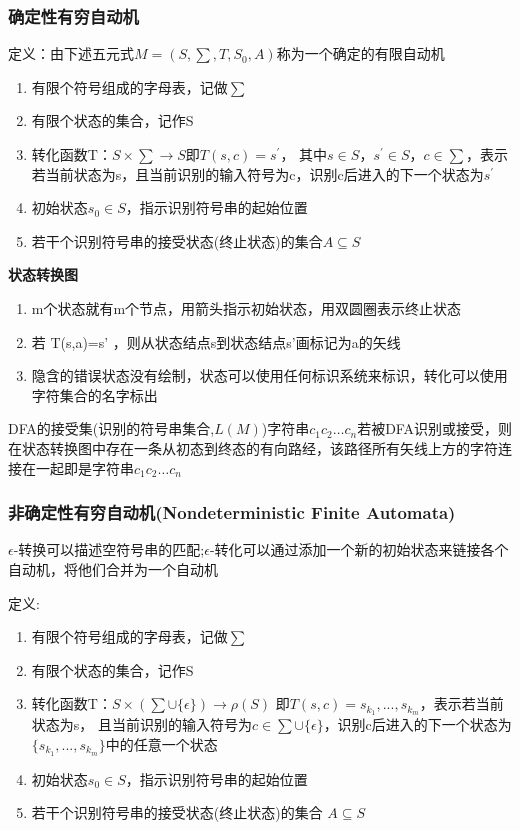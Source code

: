 \documentclass[utf8]{ctexart}
\begin{document}
\subsubsection{确定性有穷自动机}
定义：由下述五元式$M=(S,\sum ,T,S_0,A)$称为一个确定的有限自动机
\begin{enumerate}
    \item 有限个符号组成的字母表，记做$\sum$
    \item 有限个状态的集合，记作S
    \item 转化函数T：$S \times \sum  \rightarrow S$即$T(s,c)=s^{'}$，
    其中$s\in S， s^{'} \in S，c \in \sum$，表示若当前状态为s，且当前识别的输入符号为c，识别c后进入的下一个状态为$s^{'}$
    \item 初始状态$s_0 \in S$，指示识别符号串的起始位置
    \item 若干个识别符号串的接受状态(终止状态)的集合$A\subseteq S$
\end{enumerate}

\noindent \textbf{状态转换图}
\begin{enumerate}
    \item m个状态就有m个节点，用箭头指示初始状态，用双圆圈表示终止状态
    \item 若 T(s,a)=s’ ，则从状态结点s到状态结点s’画标记为a的矢线
    \item 隐含的错误状态没有绘制，状态可以使用任何标识系统来标识，转化可以使用字符集合的名字标出
\end{enumerate}
DFA的接受集(识别的符号串集合,$L(M)$)字符串$c_{1} c_{2} \dots c_{n}$若被DFA识别或接受，则在状态转换图中存在一条从初态到终态的有向路经，该路径所有矢线上方的字符连接在一起即是字符串$c_{1} c_{2} \dots c_{n}$

\subsubsection{非确定性有穷自动机(Nondeterministic Finite Automata)}
$\epsilon$-转换可以描述空符号串的匹配;$\epsilon$-转化可以通过添加一个新的初始状态来链接各个自动机，将他们合并为一个自动机

\noindent 定义:
\begin{enumerate}
    \item 有限个符号组成的字母表，记做$\sum$
    \item 有限个状态的集合，记作S
    \item 转化函数T：$S×(\sum \cup \{\epsilon\}) \rightarrow \rho(S)$
    即$T(s,c)={s_{k_1}, ... , s_{k_m}}$，表示若当前状态为s，
    且当前识别的输入符号为$c \in \sum \cup \{\epsilon\}$，识别c后进入的下一个状态为$\{s_{k_1}, ... , s_{k_m}\}$中的任意一个状态
    \item 初始状态$s_0 \in S$，指示识别符号串的起始位置
    \item 若干个识别符号串的接受状态(终止状态)的集合 $A \subseteq S$
\end{enumerate}
\end{document}
